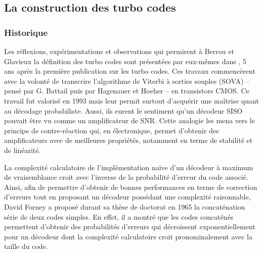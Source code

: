 \subsection{La construction des turbo codes}
\subsubsection{Historique}
Les réflexions, expérimentations et observations qui permirent à Berrou et Glavieux la définition des turbo codes sont 
présentées par eux-mêmes dans \cite{berrou1998reflections}, 5 ans après la première publication sur les turbo codes. 
Ces travaux commencèrent avec la volonté de transcrire l'algorithme de Viterbi à sorties souples (SOVA) -- pensé par G. 
Battail \cite{Battail1987} puis par Hagenauer et Hoeher \cite{HagenHoerViter} -- en transistors CMOS. Ce travail fut 
valorisé en 1993 \cite{BerrouHardwareSOVA} mais leur permit surtout d'acquérir une maîtrise quant au décodage 
probabiliste. Aussi, ils eurent le sentiment qu'un décodeur SISO pouvait être vu comme un amplificateur de SNR. Cette 
analogie les mena vers le principe de contre-réaction qui, en électronique, permet d'obtenir des amplificateurs avec de 
meilleures propriétés, notamment en terme de stabilité et de linéarité.

La complexité calculatoire de l’implémentation naïve d'un décodeur à maximum de vraisemblance croit avec l'inverse de la 
probabilité d'erreur du code associé. Ainsi, afin de permettre d'obtenir de bonnes performances en terme de correction 
d'erreurs tout en proposant un décodeur possédant une complexité raisonnable, David Forney a proposé durant sa thèse de 
doctorat en 1965 la concaténation série de deux codes \og simples\fg \cite{forney1966concatenated}. En effet, il a montré 
que les codes concaténés permettent d'obtenir des probabilités d'erreurs qui décroissent exponentiellement pour un décodeur dont la 
complexité calculatoire croit pronominalement avec la taille du code.

